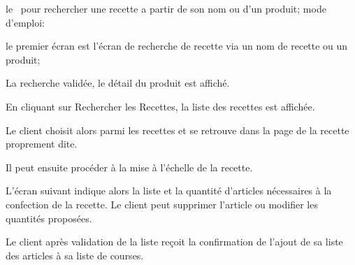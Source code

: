 \item le \cu\ \from[CHREC] pour rechercher une recette a partir de son nom ou d'un produit; mode d'emploi:
    \startitemize[n]
\item le premier écran est l'écran de recherche de recette via un nom de recette ou un produit;
\item La recherche validée, le détail du produit est affiché.
\item En cliquant sur Rechercher les Recettes, la liste des recettes est affichée.
\item Le client choisit alors parmi les recettes et se retrouve dans la page de la recette proprement dite.
\item Il peut ensuite procéder à la mise à l'échelle de la recette.
\item L'écran suivant indique alors la liste et la quantité d'articles nécessaires à la confection de la recette. 
Le client peut supprimer l'article ou modifier les quantités proposées.
\item Le client après validation de la liste reçoit la confirmation de l'ajout de sa liste des articles à sa liste de courses.
    \stopitemize
\stopitemize
